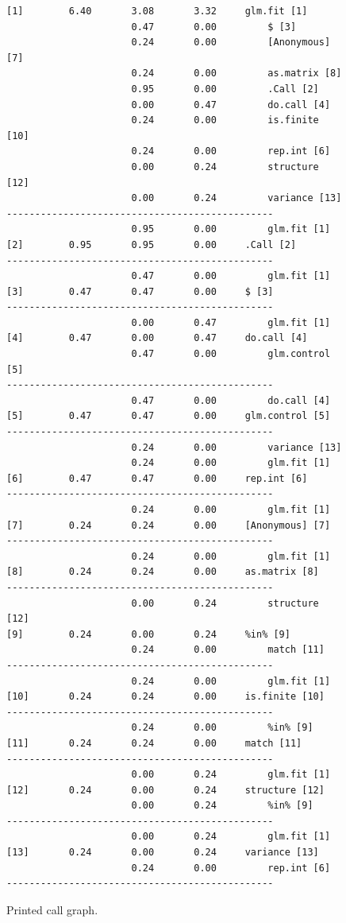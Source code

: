\documentclass[nojss]{jss}\usepackage[]{graphicx}\usepackage[]{color}
\makeatletter
\newenvironment{kframe}{%
 \def\at@end@of@kframe{}%
 \ifinner\ifhmode%
  \def\at@end@of@kframe{\end{minipage}}%
  \begin{minipage}{\columnwidth}%
 \fi\fi%
 \def\FrameCommand##1{\hskip\@totalleftmargin \hskip-\fboxsep
 \colorbox{shadecolor}{##1}\hskip-\fboxsep
     \hskip-\linewidth \hskip-\@totalleftmargin \hskip\columnwidth}%
 \MakeFramed {\advance\hsize-\width
   \@totalleftmargin\z@ \linewidth\hsize
   \@setminipage}}%
 {\par\unskip\endMakeFramed%
 \at@end@of@kframe}
\newenvironment{knitrout}{}{} %
\makeatother
\begin{document}
\begin{figure}
\begin{knitrout}
\begin{kframe}
\begin{verbatim}
[1]        6.40       3.08       3.32     glm.fit [1]    
                      0.47       0.00         $ [3] 
                      0.24       0.00         [Anonymous] [7] 
                      0.24       0.00         as.matrix [8] 
                      0.95       0.00         .Call [2] 
                      0.00       0.47         do.call [4] 
                      0.24       0.00         is.finite [10] 
                      0.24       0.00         rep.int [6] 
                      0.00       0.24         structure [12] 
                      0.00       0.24         variance [13] 
-----------------------------------------------
                      0.95       0.00         glm.fit [1] 
[2]        0.95       0.95       0.00     .Call [2]    
-----------------------------------------------
                      0.47       0.00         glm.fit [1] 
[3]        0.47       0.47       0.00     $ [3]    
-----------------------------------------------
                      0.00       0.47         glm.fit [1] 
[4]        0.47       0.00       0.47     do.call [4]    
                      0.47       0.00         glm.control [5] 
-----------------------------------------------
                      0.47       0.00         do.call [4] 
[5]        0.47       0.47       0.00     glm.control [5]    
-----------------------------------------------
                      0.24       0.00         variance [13] 
                      0.24       0.00         glm.fit [1] 
[6]        0.47       0.47       0.00     rep.int [6]    
-----------------------------------------------
                      0.24       0.00         glm.fit [1] 
[7]        0.24       0.24       0.00     [Anonymous] [7]    
-----------------------------------------------
                      0.24       0.00         glm.fit [1] 
[8]        0.24       0.24       0.00     as.matrix [8]    
-----------------------------------------------
                      0.00       0.24         structure [12] 
[9]        0.24       0.00       0.24     %in% [9]    
                      0.24       0.00         match [11] 
-----------------------------------------------
                      0.24       0.00         glm.fit [1] 
[10]       0.24       0.24       0.00     is.finite [10]   
-----------------------------------------------
                      0.24       0.00         %in% [9] 
[11]       0.24       0.24       0.00     match [11]   
-----------------------------------------------
                      0.00       0.24         glm.fit [1] 
[12]       0.24       0.00       0.24     structure [12]   
                      0.00       0.24         %in% [9] 
-----------------------------------------------
                      0.00       0.24         glm.fit [1] 
[13]       0.24       0.00       0.24     variance [13]   
                      0.24       0.00         rep.int [6] 
-----------------------------------------------
\end{verbatim}
\end{kframe}
\end{knitrout}
\caption{Printed call graph.}
\label{fig:printGraph}
\end{figure}
\end{document}
